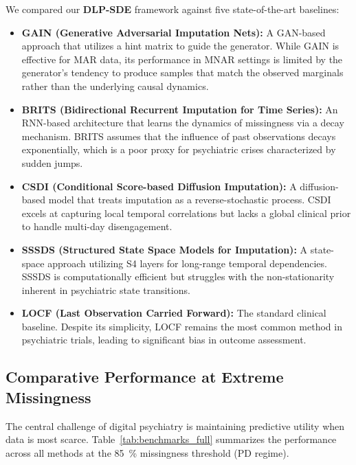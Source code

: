 We compared our \textbf{DLP-SDE} framework against five state-of-the-art baselines:
\begin{itemize}
    \item \textbf{GAIN (Generative Adversarial Imputation Nets):} A GAN-based approach that utilizes a hint matrix to guide the generator. While GAIN is effective for MAR data, its performance in MNAR settings is limited by the generator's tendency to produce samples that match the observed marginals rather than the underlying causal dynamics.
    \item \textbf{BRITS (Bidirectional Recurrent Imputation for Time Series):} An RNN-based architecture that learns the dynamics of missingness via a decay mechanism. BRITS assumes that the influence of past observations decays exponentially, which is a poor proxy for psychiatric crises characterized by sudden jumps.
    \item \textbf{CSDI (Conditional Score-based Diffusion Imputation):} A diffusion-based model that treats imputation as a reverse-stochastic process. CSDI excels at capturing local temporal correlations but lacks a global clinical prior to handle multi-day disengagement.
    \item \textbf{SSSDS (Structured State Space Models for Imputation):} A state-space approach utilizing S4 layers for long-range temporal dependencies. SSSDS is computationally efficient but struggles with the non-stationarity inherent in psychiatric state transitions.
    \item \textbf{LOCF (Last Observation Carried Forward):} The standard clinical baseline. Despite its simplicity, LOCF remains the most common method in psychiatric trials, leading to significant bias in outcome assessment.
\end{itemize}

\subsection{Comparative Performance at Extreme Missingness}
The central challenge of digital psychiatry is maintaining predictive utility when data is most scarce. Table~\ref{tab:benchmarks_full} summarizes the performance across all methods at the \SI{85}{\percent} missingness threshold (PD regime).

